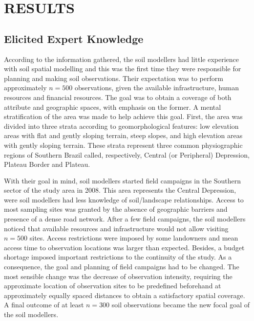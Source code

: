 \section{RESULTS}

\subsection{Elicited Expert Knowledge}
\label{sec:chap07-elicited}

According to the information gathered, the soil modellers had little experience with soil spatial 
modelling and this was the first time they were responsible for planning and making soil observations. Their 
expectation was to perform approximately $n = 500$ observations, given the available infrastructure, human 
resources and financial resources. The goal was to obtain a  coverage of both attribute and 
geographic spaces, with emphasis on the former. A mental stratification of the area was made to help achieve 
this goal. First, the area was divided into three strata according to geomorphological features: low elevation 
areas with flat and gently sloping terrain, steep slopes, and high elevation areas with gently sloping 
terrain. These strata represent three common physiographic regions of Southern Brazil called, respectively, 
Central (or Peripheral) Depression, Plateau Border and Plateau.

With their goal in mind, soil modellers started field campaigns in the Southern sector of the study area in 
\num{2008}. This area represents the Central Depression, were soil modellers had less knowledge of 
soil\-/landscape relationships. Access to most sampling sites was granted by the absence of geographic 
barriers and presence of a dense road network. After a few field campaigns, the soil modellers noticed that 
available resources and infrastructure would not allow visiting $n = 500$ sites. Access restrictions were 
imposed by some landowners and mean access time to observation locations was larger than expected. Besides, a 
budget shortage imposed important restrictions to the continuity of the study. As a consequence, the goal and 
planning of field campaigns had to be changed. The most sensible change was the decrease of observation 
intensity, requiring the approximate location of observation sites to be predefined beforehand at 
approximately equally spaced distances to obtain a satisfactory spatial coverage. A final outcome of at least 
$n = 300$ soil observations became the new focal goal of the soil modellers.


